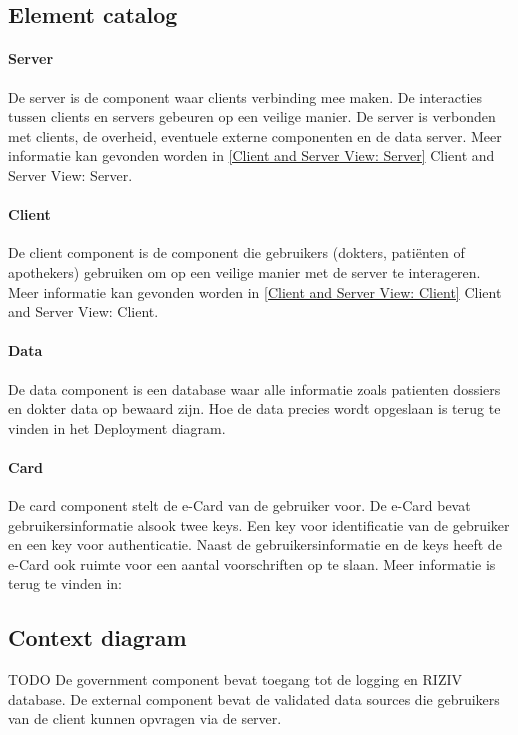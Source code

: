 \documentclass[a4paper,10pt]{article}
\begin{document}
\subsection{Element catalog}

\paragraph{Server}
De server is de component waar clients verbinding mee maken.  De interacties tussen clients en servers gebeuren op een veilige manier.  De server is verbonden met clients, de overheid, eventuele externe componenten en de data server.  Meer informatie kan gevonden worden in \ref{Client and Server View: Server} Client and Server View: Server.

\paragraph{Client}
De client component is de component die gebruikers (dokters, pati\"{e}nten of apothekers) gebruiken om op een veilige manier met de server te interageren.  Meer informatie kan gevonden worden in \ref{Client and Server View: Client} Client and Server View: Client.

\paragraph{Data}
De data component is een database waar alle informatie zoals patienten dossiers en dokter data op bewaard zijn.  Hoe de data precies wordt opgeslaan is terug te vinden in het Deployment diagram.

\paragraph{Card}
De card component stelt de e-Card van de gebruiker voor.  De e-Card bevat gebruikersinformatie alsook twee keys.  Een key voor identificatie van de gebruiker en een key voor authenticatie.  Naast de gebruikersinformatie en de keys heeft de e-Card ook ruimte voor een aantal voorschriften op te slaan.  Meer informatie is terug te vinden in:

\subsection{Context diagram}
TODO
De government component bevat toegang tot de logging en RIZIV database.
De external component bevat de validated data sources die gebruikers van de client kunnen opvragen via de server.
\end{document}
